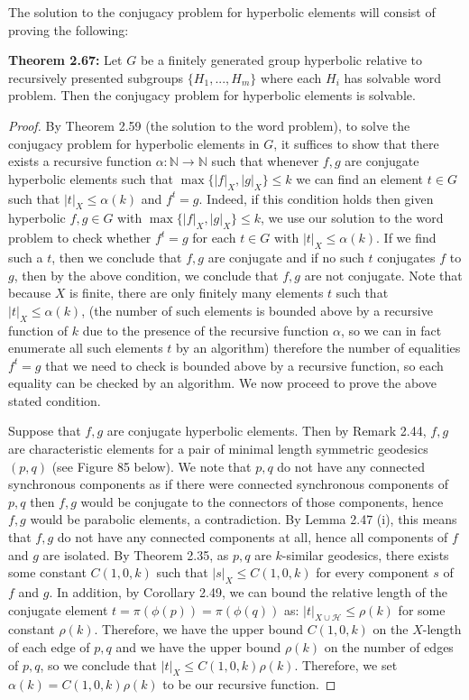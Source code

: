 \documentclass[12pt]{article}
\newcommand{\vs}{\vskip10pt}
\begin{document}
	The solution to the conjugacy problem for hyperbolic elements will consist of proving the following: 
	
	\vs 
	
	\textbf{Theorem 2.67: } Let $G$ be a finitely generated group hyperbolic relative to recursively presented subgroups $\{H_1,...,H_m\}$ where each $H_i$ has solvable word problem. Then the conjugacy problem for hyperbolic elements is solvable. 
	
	\begin{proof}
			By Theorem 2.59 (the solution to the word problem), to solve the conjugacy problem for hyperbolic elements in $G$, it suffices to show that there exists a recursive function $\alpha: \mathbb{N} \rightarrow \mathbb{N}$ such that whenever $f,g$ are conjugate hyperbolic elements such that $\max\{ \vert f \vert_X, \vert g \vert_X \} \leq k$ we can find an element $t \in G$ such that $\vert t \vert_X \leq \alpha(k)$ and $f^t = g$. Indeed, if this condition holds then given hyperbolic $f,g \in G$ with $\max\{ \vert f \vert_X, \vert g \vert_X \} \leq k$, we use our solution to the word problem to check whether $f^t = g$ for each $t \in G$ with $\vert t \vert_X \leq \alpha(k)$. If we find such a $t$, then we conclude that $f,g$ are conjugate and if no such $t$ conjugates $f$ to $g$, then by the above condition, we conclude that $f,g$ are not conjugate. Note that because $X$ is finite, there are only finitely many elements $t$ such that $\vert t \vert_X \leq \alpha(k)$, (the number of such elements is bounded above by a recursive function of $k$ due to the presence of the recursive function $\alpha$, so we can in fact enumerate all such elements $t$ by an algorithm) therefore the number of equalities $f^t = g$ that we need to check is bounded above by a recursive function, so each equality can be checked by an algorithm. We now proceed to prove the above stated condition. 
		
		\vs 
		
		Suppose that $f,g$ are conjugate hyperbolic elements. Then by Remark 2.44, $f,g$ are characteristic elements for a pair of minimal length symmetric geodesics $(p,q)$ (see Figure 85 below). We note that $p,q$ do not have any connected synchronous components as if there were connected synchronous components of $p,q$ then $f,g$ would be conjugate to the connectors of those components, hence $f,g$ would be parabolic elements, a contradiction. By Lemma 2.47 (i), this means that $f,g$ do not have any connected components at all, hence all components of $f$ and $g$ are isolated. By Theorem 2.35, as $p,q$ are $k$-similar geodesics, there exists some constant $C(1,0,k)$ such that $\vert s \vert_X \leq C(1,0,k)$ for every component $s$ of $f$ and $g$. In addition, by Corollary 2.49, we can bound the relative length of the conjugate element $t = \pi(\phi(p)) = \pi(\phi(q))$ as: $\vert t \vert_{X \cup \mathcal{H}} \leq \rho(k)$ for some constant $\rho(k)$. Therefore, we have the upper bound $C(1,0,k)$ on the $X$-length of each edge of $p,q$ and we have the upper bound $\rho(k)$ on the number of edges of $p,q$, so we conclude that $\vert t \vert_X \leq C(1,0,k)\rho(k)$. Therefore, we set $\alpha(k) = C(1,0,k)\rho(k)$ to be our recursive function. 
		

\end{proof}
\end{document}
